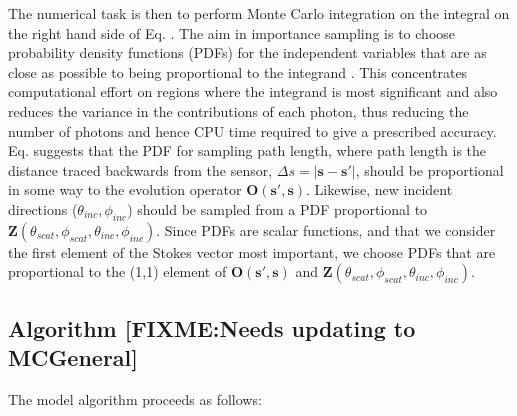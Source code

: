The numerical task is then to perform Monte Carlo
integration on the integral on the right hand side of
Eq. .
The aim in importance sampling is to choose probability density functions
(PDFs) for the independent variables that are
as close as possible to being proportional to the integrand
\cite{liu:01}. This concentrates computational effort on regions where
the integrand is most significant and also reduces the variance in the contributions of each photon, thus reducing
the number of photons and hence CPU time required to give a
prescribed accuracy.  Eq.  suggests that the PDF for
sampling path length, where path length is the distance traced backwards
from the sensor, $\Delta s=\left|\mathbf{s}-\mathbf{s'}\right|$, should be proportional in some way to the evolution
operator $\mathbf{O(s',s)}$. Likewise, new incident directions
($\theta_{inc},\phi_{inc}$) should be sampled from a PDF proportional
to
$\mathbf{Z}(\theta_{scat},\phi_{scat},\theta_{inc},\phi_{inc})$.
Since PDFs are scalar functions, and that we consider the first element of the
Stokes vector most important, we choose PDFs that are proportional to the
(1,1) element of $\mathbf{O(s',s)}$ and $\mathbf{Z}(\theta_{scat},\phi_{scat},\theta_{inc},\phi_{inc})$. 
\subsection{Algorithm [FIXME:Needs updating to MCGeneral]}
The model algorithm proceeds as follows:

